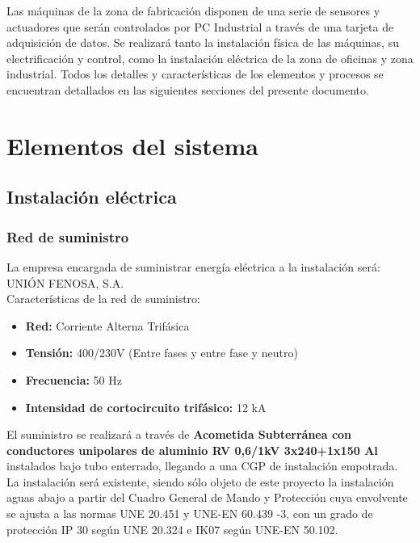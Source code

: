 \pagebreak

Las máquinas de la zona de fabricación disponen de una serie de sensores y actuadores que serán controlados por PC Industrial a través de una tarjeta de adquisición de datos. Se realizará tanto la instalación física de las máquinas, su electrificación y control, como la instalación eléctrica de la zona de oficinas y zona industrial. Todos los detalles y características de los elementos y procesos se encuentran detallados en las siguientes secciones del presente documento.

\section{Elementos del sistema}

\subsection{Instalación eléctrica}

\subsubsection{Red de suministro}

La empresa encargada de suministrar energía eléctrica a la instalación será:\\
UNIÓN FENOSA, S.A.\\

Características de la red de suministro:\

\begin{itemize}
\item {\bfseries Red:} Corriente Alterna Trifásica 
\item {\bfseries Tensión:} 400/230V (Entre fases y entre fase y neutro)
\item {\bfseries Frecuencia:} 50 Hz
\item {\bfseries Intensidad de cortocircuito trifásico:} 12 kA
\end{itemize}

El suministro se realizará a través de {\bfseries Acometida Subterránea con conductores unipolares de aluminio RV 0,6/1kV 3x240+1x150 Al} instalados bajo tubo enterrado, llegando a una CGP de instalación empotrada. La instalación será existente, siendo sólo objeto de este proyecto la instalación aguas abajo a partir del Cuadro General de Mando y Protección cuya envolvente se ajusta a las normas UNE 20.451 y UNE-EN 60.439 -3, con un grado de protección IP 30 según UNE 20.324 e IK07 según UNE-EN 50.102.\\


